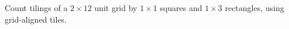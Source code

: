 Count tilings of a $2\times12$ unit grid by $1\times1$ squares and $1\times3$ rectangles, using grid-aligned tiles.
